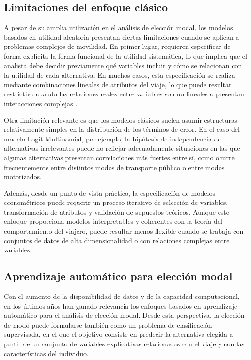 \subsection{Limitaciones del enfoque clásico}

A pesar de su amplia utilización en el análisis de elección modal, los modelos basados en utilidad aleatoria presentan ciertas limitaciones cuando se aplican a problemas complejos de movilidad. En primer lugar, requieren especificar de forma explícita la forma funcional de la utilidad sistemática, lo que implica que el analista debe decidir previamente qué variables incluir y cómo se relacionan con la utilidad de cada alternativa. En muchos casos, esta especificación se realiza mediante combinaciones lineales de atributos del viaje, lo que puede resultar restrictivo cuando las relaciones reales entre variables son no lineales o presentan interacciones complejas \cite[p.~20]{MartinBaos2023Thesis}.

Otra limitación relevante es que los modelos clásicos suelen asumir estructuras relativamente simples en la distribución de los términos de error. En el caso del modelo Logit Multinomial, por ejemplo, la hipótesis de independencia de alternativas irrelevantes puede no reflejar adecuadamente situaciones en las que algunas alternativas presentan correlaciones más fuertes entre sí, como ocurre frecuentemente entre distintos modos de transporte público o entre modos motorizados.

Además, desde un punto de vista práctico, la especificación de modelos econométricos puede requerir un proceso iterativo de selección de variables, transformación de atributos y validación de supuestos teóricos. Aunque este enfoque proporciona modelos interpretables y coherentes con la teoría del comportamiento del viajero, puede resultar menos flexible cuando se trabaja con conjuntos de datos de alta dimensionalidad o con relaciones complejas entre variables.


\subsection{Aprendizaje automático para elección modal}

Con el aumento de la disponibilidad de datos y de la capacidad computacional, en los últimos años han ganado relevancia los enfoques basados en aprendizaje automático para el análisis de elección modal. Desde esta perspectiva, la elección de modo puede formularse también como un problema de clasificación supervisada, en el que el objetivo consiste en predecir la alternativa elegida a partir de un conjunto de variables explicativas relacionadas con el viaje y con las características del individuo.

